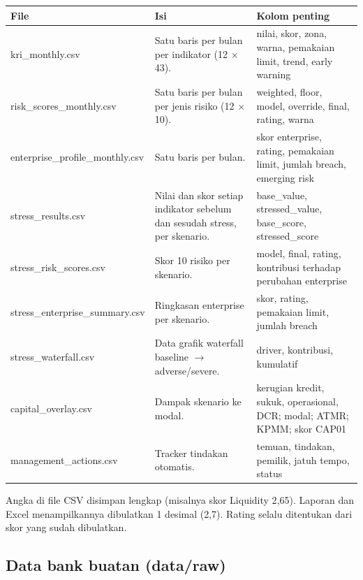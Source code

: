 \documentclass[11pt,a4paper]{article}
\begin{document}
\begin{longtable}{>{\ttfamily\small\raggedright\arraybackslash}p{4.6cm}>{\raggedright\arraybackslash}p{4.9cm}>{\raggedright\arraybackslash}p{5.3cm}}
\toprule
\textrm{\textbf{File}} & \textbf{Isi} & \textbf{Kolom penting} \\
\midrule
\endhead
kri\_\allowbreak{}monthly.csv & Satu baris per bulan per indikator (12 $\times$ 43). & nilai, skor, zona, warna, pemakaian limit, trend, early warning \\
risk\_\allowbreak{}scores\_\allowbreak{}monthly.csv & Satu baris per bulan per jenis risiko (12 $\times$ 10). & weighted, floor, model, override, final, rating, warna \\
enterprise\_\allowbreak{}profile\_\allowbreak{}monthly.csv & Satu baris per bulan. & skor enterprise, rating, pemakaian limit, jumlah breach, emerging risk \\
stress\_\allowbreak{}results.csv & Nilai dan skor setiap indikator sebelum dan sesudah stress, per skenario. & base\_\allowbreak{}value, stressed\_\allowbreak{}value, base\_\allowbreak{}score, stressed\_\allowbreak{}score \\
stress\_\allowbreak{}risk\_\allowbreak{}scores.csv & Skor 10 risiko per skenario. & model, final, rating, kontribusi terhadap perubahan enterprise \\
stress\_\allowbreak{}enterprise\_\allowbreak{}summary.csv & Ringkasan enterprise per skenario. & skor, rating, pemakaian limit, jumlah breach \\
stress\_\allowbreak{}waterfall.csv & Data grafik waterfall baseline $\rightarrow$ adverse/severe. & driver, kontribusi, kumulatif \\
capital\_\allowbreak{}overlay.csv & Dampak skenario ke modal. & kerugian kredit, sukuk, operasional, DCR; modal; ATMR; KPMM; skor CAP01 \\
management\_\allowbreak{}actions.csv & Tracker tindakan otomatis. & temuan, tindakan, pemilik, jatuh tempo, status \\
\bottomrule
\end{longtable}

\begin{infobox}
Angka di file CSV disimpan lengkap (misalnya skor Liquidity 2{,}65). Laporan dan Excel menampilkannya dibulatkan 1 desimal (2{,}7). Rating selalu ditentukan dari skor yang sudah dibulatkan.
\end{infobox}

\subsection{Data bank buatan (data/raw)}
\end{document}
